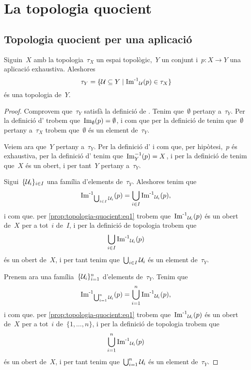 \documentclass[../../main.tex]{subfiles}
\begin{document}
\section{La topologia quocient}
    \subsection{Topologia quocient per una aplicació}
    \begin{proposition}
        \label{prop:topologia-quocient}
        Siguin~\(X\) amb la topologia~\(\tau_{X}\) un espai topològic,~\(Y\) un conjunt i~\(p\colon X\longrightarrow Y\) una aplicació exhaustiva.
        Aleshores
        \begin{equation}
            \label{prop:topologia-quocient:eq1}
            \tau_{Y}=\{\mathcal{U}\subseteq Y\mid\operatorname{\operatorname{Im}^{-1}}_{\mathcal{U}}(p)\in\tau_{X}\}
        \end{equation}
        és una topologia de~\(Y\).
    \end{proposition}
    \begin{proof} %
        Comprovem que~\(\tau_{Y}\) satisfà la definició de .
        Tenim que~\(\emptyset\) pertany a~\(\tau_{Y}\).
        Per la definició d' trobem que~\(\operatorname{Im}_{\emptyset}(p)=\emptyset\), i com que per la definició de  tenim que~\(\emptyset\) pertany a~\(\tau_{X}\) trobem que~\(\emptyset\) és un element de~\(\tau_{Y}\).

        Veiem ara que~\(Y\) pertany a~\(\tau_{Y}\).
        Per la definició d' i com que, per hipòtesi,~\(p\) és exhaustiva, per la definició d' tenim que~\(\operatorname{Im}_{Y}^{-1}(p)=X\), i per la definició de  tenim que~\(X\) és un obert, i per tant~\(Y\) pertany a~\(\tau_{Y}\).

        Sigui~\(\{\mathcal{U}_{i}\}_{i\in I}\) una família d'elements de~\(\tau_{Y}\).
        Aleshores tenim que
        \[
            \operatorname{\operatorname{Im}^{-1}}_{\bigcup_{i\in I}\mathcal{U}_{i}}(p)=\bigcup_{i\in I}\operatorname{\operatorname{Im}^{-1}}_{\mathcal{U}_{i}}(p),
        \]
        i com que.
        per \eqref{prop:topologia-quocient:eq1} trobem que~\(\operatorname{\operatorname{Im}^{-1}}_{\mathcal{U}_{i}}(p)\) és un obert de~\(X\) per a tot~\(i\) de~\(I\), i per la definició de topologia trobem que
        \[
            \bigcup_{i\in I}\operatorname{\operatorname{Im}^{-1}}_{\mathcal{U}_{i}}(p)
        \]
        és un obert de~\(X\), i per tant tenim que~\(\bigcup_{i\in I}\mathcal{U}_{i}\) és un element de~\(\tau_{Y}\).

        Prenem ara una família~\(\{\mathcal{U}_{i}\}_{i=1}^{n}\) d'elements de~\(\tau_{Y}\).
        Tenim que
        \[
            \operatorname{\operatorname{Im}^{-1}}_{\bigcup_{i=1}^{n}\mathcal{U}_{i}}(p)=\bigcup_{i=1}^{n}\operatorname{\operatorname{Im}^{-1}}_{\mathcal{U}_{i}}(p),
        \]
        i com que.
        per \eqref{prop:topologia-quocient:eq1} trobem que~\(\operatorname{\operatorname{Im}^{-1}}_{\mathcal{U}_{i}}(p)\) és un obert de~\(X\) per a tot~\(i\) de~\(\{1,\dots,n\}\), i per la definició de topologia trobem que
        \[
            \bigcup_{i=1}^{n}\operatorname{\operatorname{Im}^{-1}}_{\mathcal{U}_{i}}(p)
        \]
        és un obert de~\(X\), i per tant tenim que~\(\bigcup_{i=1}^{n}\mathcal{U}_{i}\) és un element de~\(\tau_{Y}\).
    \end{proof}
\end{document}

